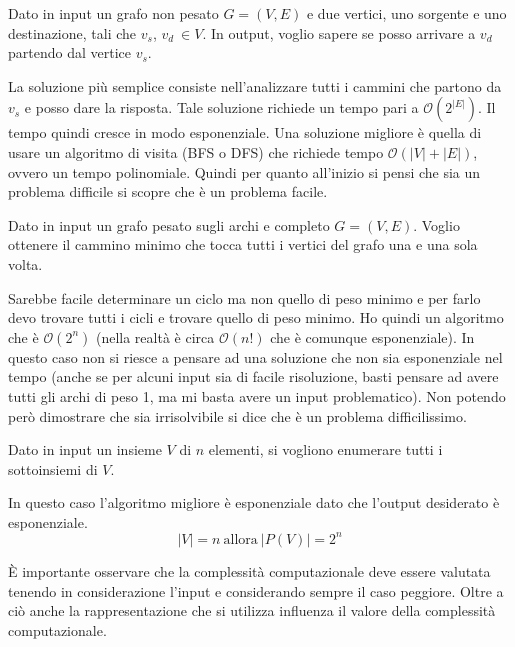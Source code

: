 \begin{esempio} 
    Dato in input un grafo non pesato $G = (V,E)$ e due vertici, uno sorgente e uno destinazione, tali che $v_s$, $v_d \ \in V$. In output, voglio sapere se posso arrivare a $v_d$ partendo dal vertice $v_s$.
    
    La soluzione più semplice consiste nell'analizzare tutti i cammini che partono da $v_s$ e posso dare la risposta. Tale soluzione richiede un tempo pari a $\mathcal{O}(2^{|E|})$. Il tempo quindi cresce in modo esponenziale. Una soluzione migliore è quella di usare un algoritmo di visita (BFS o DFS) che richiede tempo $\mathcal{O}(|V | + |E|)$, ovvero un tempo polinomiale. Quindi per quanto all'inizio si pensi che sia un problema difficile si scopre che è un problema facile.
\end{esempio}
\begin{esempio}
    Dato in input un grafo pesato sugli archi e completo $G = (V,E)$. Voglio ottenere il cammino minimo che tocca tutti i vertici del grafo una e una sola volta.
    
    Sarebbe facile determinare un ciclo ma non quello di peso minimo e per farlo devo trovare tutti i cicli e trovare quello di peso minimo. Ho quindi un algoritmo che è $\mathcal{O}(2^n)$ (nella realtà è circa $\mathcal{O}(n!)$ che è comunque esponenziale). In questo caso non si riesce a pensare ad una soluzione che non sia esponenziale nel tempo (anche se per alcuni input sia di facile risoluzione, basti pensare ad avere tutti gli archi di peso 1, ma mi basta avere un input problematico). Non potendo però dimostrare che sia irrisolvibile si dice che è un problema difficilissimo.
\end{esempio}
\begin{esempio} 
    Dato in input un insieme $V$ di $n$ elementi, si vogliono enumerare tutti i sottoinsiemi di $V$.

    In questo caso l'algoritmo migliore è esponenziale dato che l'output desiderato è esponenziale. 
    \begin{equation}
        |V| = n \ \text{allora} \ |P(V)| = 2^n
    \end{equation}
\end{esempio}

È importante osservare che la complessità computazionale deve essere valutata tenendo in considerazione l'input e considerando sempre il caso peggiore. Oltre a ciò anche la rappresentazione che si utilizza influenza il valore della complessità computazionale.